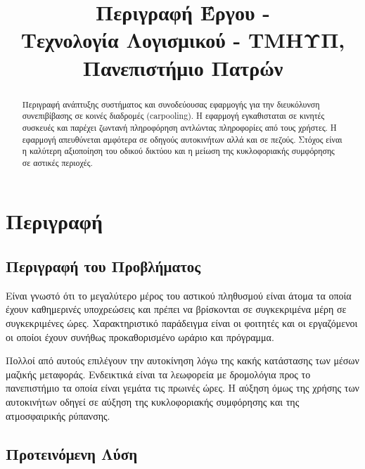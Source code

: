 

\fancyhead[R]{\leftmark}

\title{
    Περιγραφή Έργου - \appname\\[1ex]
    \large Τεχνολογία Λογισμικού - ΤΜΗΥΠ, Πανεπιστήμιο Πατρών \\[2ex]
}



\maketitle
\thispagestyle{empty}
\newpage

\tableofcontents
\newpage

\begin{abstract}
    Περιγραφή ανάπτυξης συστήματος και συνοδεύουσας εφαρμογής για την διευκόλυνση
    συνεπιβίβασης σε κοινές διαδρομές (carpooling). Η εφαρμογή εγκαθισταται σε
    κινητές συσκευές και παρέχει ζωντανή πληροφόρηση
    αντλώντας πληροφορίες από τους χρήστες. H εφαρμογή απευθύνεται αμφότερα σε
    οδηγούς αυτοκινήτων αλλά και σε πεζούς. Στόχος είναι η καλύτερη αξιοποίηση
    του οδικού δικτύου και η μείωση της κυκλοφοριακής συμφόρησης σε αστικές
    περιοχές.
\end{abstract}

\newpage

\section{Περιγραφή}

\subsection{Περιγραφή του Προβλήματος}

Είναι γνωστό ότι το μεγαλύτερο μέρος του αστικού πληθυσμού είναι άτομα τα
οποία έχουν καθημερινές υποχρεώσεις και πρέπει να βρίσκονται
σε συγκεκριμένα μέρη σε συγκεκριμένες ώρες. Χαρακτηριστικό παράδειγμα είναι οι
φοιτητές και οι εργαζόμενοι οι οποίοι έχουν συνήθως προκαθορισμένο ωράριο και
πρόγραμμα.

Πολλοί από αυτούς επιλέγουν την αυτοκίνηση λόγω της κακής κατάστασης των μέσων
μαζικής μεταφοράς. Ενδεικτικά είναι τα λεωφορεία με δρομολόγια
προς το πανεπιστήμιο τα οποία είναι γεμάτα τις πρωινές ώρες. Η αύξηση όμως της
χρήσης των αυτοκινήτων οδηγεί σε αύξηση της κυκλοφοριακής συμφόρησης και
της ατμοσφαιρικής ρύπανσης.

\subsection{Προτεινόμενη Λύση}

